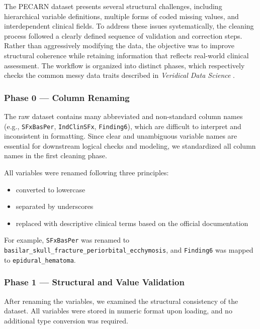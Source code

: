 \documentclass[11pt,letterpaper]{article}
\begin{document}
The PECARN dataset presents several structural challenges, including hierarchical variable definitions, multiple forms of coded missing values, and interdependent clinical fields. To address these issues systematically, the cleaning process followed a clearly defined sequence of validation and correction steps. Rather than aggressively modifying the data, the objective was to improve structural coherence while retaining information that reflects real-world clinical assessment. The workflow is organized into distinct phases, which respectively checks the common messy data traits described in \textit{Veridical Data Science} \citep{yu2020veridical}.

\subsubsection{Phase 0 — Column Renaming}\label{Phase 0 — Column Renaming}

The raw dataset contains many abbreviated and non-standard column names (e.g., \texttt{SFxBasPer}, \texttt{IndClinSFx}, \texttt{Finding6}), which are difficult to interpret and inconsistent in formatting. Since clear and unambiguous variable names are essential for downstream logical checks and modeling, we standardized all column names in the first cleaning phase.

All variables were renamed following three principles:

\begin{itemize}
\item converted to lowercase
\item separated by underscores
\item replaced with descriptive clinical terms based on the official documentation
\end{itemize}

For example, \texttt{SFxBasPer} was renamed to \texttt{basilar\_skull\_fracture\_periorbital\_ecchymosis}, and \texttt{Finding6} was mapped to \texttt{epidural\_hematoma}.

\subsubsection{Phase 1 — Structural and Value Validation}\label{Phase 1 — Structural Validation}

After renaming the variables, we examined the structural consistency of the dataset. All variables were stored in numeric format upon loading, and no additional type conversion was required.
\end{document}
